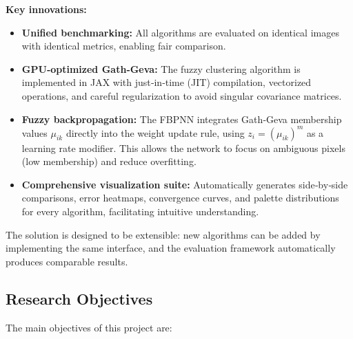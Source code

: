 \textbf{Key innovations:}
\begin{itemize}
    \item \textbf{Unified benchmarking:} All algorithms are evaluated on identical images with identical metrics, enabling fair comparison.
    \item \textbf{GPU‑optimized Gath‑Geva:} The fuzzy clustering algorithm is implemented in JAX with just‑in‑time (JIT) compilation, vectorized operations, and careful regularization to avoid singular covariance matrices.
    \item \textbf{Fuzzy backpropagation:} The FBPNN integrates Gath‑Geva membership values \( \mu_{ik} \) directly into the weight update rule, using \( z_i = (\mu_{ik})^m \) as a learning rate modifier. This allows the network to focus on ambiguous pixels (low membership) and reduce overfitting.
    \item \textbf{Comprehensive visualization suite:} Automatically generates side‑by‑side comparisons, error heatmaps, convergence curves, and palette distributions for every algorithm, facilitating intuitive understanding.
\end{itemize}

The solution is designed to be extensible: new algorithms can be added by implementing the same interface, and the evaluation framework automatically produces comparable results.

\subsection{Research Objectives}

The main objectives of this project are:

